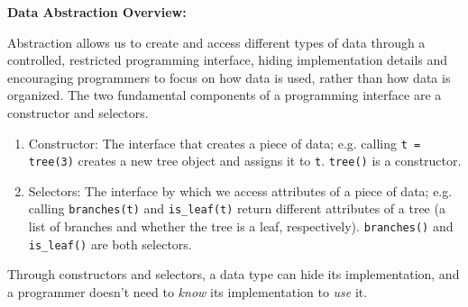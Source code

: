 \textbf{Data Abstraction Overview:}

Abstraction allows us to create and access different types of data through a controlled, restricted programming interface, hiding implementation details and encouraging programmers to focus on how data is used, rather than how data is organized. The two fundamental components of a programming interface are a constructor and selectors.
\begin{enumerate}
	\item Constructor: The interface that creates a piece of data; e.g. calling \texttt{t = tree(3)} creates a new tree object and assigns it to \texttt{t}. \texttt{tree()} is a constructor.
	\item Selectors: The interface by which we access attributes of a piece of data; e.g. calling \texttt{branches(t)} and \texttt{is\_leaf(t)} return different attributes of a tree (a list of branches and whether the tree is a leaf, respectively). \texttt{branches()} and \texttt{is\_leaf()} are both selectors.
\end{enumerate}

Through constructors and selectors, a data type can hide its implementation, and a programmer doesn’t need to {\it know} its implementation to {\it use} it.